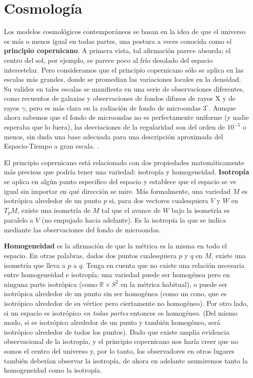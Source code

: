\documentclass[11pt,b5paper,openany,twoside]{book}
\newcommand{\R}{\mathbb{R}}
\begin{document}
\chapter{Cosmología}



Los modelos cosmológicos contemporáneos se basan en la idea de que el universo es más o menos igual en todas partes, una postura a veces conocida como el {\bf principio copernicano}.
A primera vista, tal afirmación parece absurda; el centro del sol, por ejemplo, se parece poco al frío desolado del espacio interestelar.
Pero consideramos que el principio copernicano sólo se aplica en las escalas más grandes, donde se promedian las variaciones locales en la densidad.
Su validez en tales escalas se manifiesta en una serie de observaciones diferentes, como recuentos de galaxias y observaciones de fondos difusos de rayos X y de rayos $\gamma$, pero es más clara en la radiación de fondo de microondas $3^\circ$.
Aunque ahora sabemos que el fondo de microondas no es perfectamente uniforme (y nadie esperaba que lo fuera), las desviaciones de la regularidad son del orden de $10^{-5}$ o menos, sin duda una base adecuada para una descripción aproximada del Espacio-Tiempo a gran escala. .

El principio copernicano está relacionado con dos propiedades matemáticamente más precisas que podría tener una variedad: isotropía y homogeneidad.
{\bf Isotropía} se aplica en algún punto específico del espacio y establece que el espacio se ve igual sin importar en qué dirección se mire.
Más formalmente, una variedad $M$ es isotrópica alrededor de un punto $p$ si, para dos vectores cualesquiera $V$ y $W$ en $T_pM$, existe una isometría de $M$ tal que el avance de $W$ bajo la isometría es paralelo a $V$ (no empujado hacia adelante).
Es la isotropía la que se indica mediante las observaciones del fondo de microondas.

{\bf Homogeneidad} es la afirmación de que la métrica es la misma en todo el espacio.
En otras palabras, dados dos puntos cualesquiera $p$ y $q$ en $M$, existe una isometría que lleva a $p$ a $q$.
Tenga en cuenta que no existe una relación necesaria entre homogeneidad e isotropía; una variedad puede ser homogénea pero en ninguna parte isotrópica (como $\R\times S^2$ en la métrica habitual), o puede ser isotrópica alrededor de un punto sin ser homogénea (como un cono, que es isotrópico alrededor de su vértice pero ciertamente no homogéneo).
Por otro lado, si un espacio es isotrópico {\it en todas partes} entonces es homogéneo.
(Del mismo modo, si es isotrópico alrededor de un punto y también homogéneo, será isotrópico alrededor de todos los puntos).
Dado que existe amplia evidencia observacional de la isotropía, y el principio copernicano nos haría creer que no somos el centro del universo y, por lo tanto, los observadores en otros lugares también deberían observar la isotropía, de ahora en adelante asumiremos tanto la homogeneidad como la isotropía.
\end{document}
